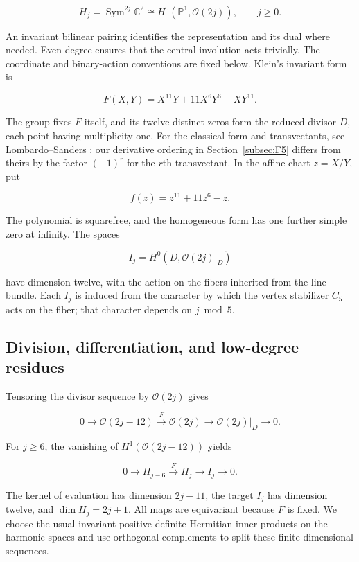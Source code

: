 \documentclass[11pt,a4paper]{article}
\begin{document}
\[
H_j=\operatorname{Sym}^{2j}\mathbb C^2
    \cong H^0(\mathbb P^1,\mathcal O(2j)),\qquad j\ge0.
\]

An invariant bilinear pairing identifies the representation and its dual where needed. Even degree ensures that the central involution acts trivially. The coordinate and binary-action conventions are fixed below. Klein's invariant form is

\[
F(X,Y)=X^{11}Y+11X^6Y^6-XY^{11}.
\]

The group fixes \(F\) itself, and its twelve distinct zeros form the reduced divisor \(D\), each point having multiplicity one. For the classical form and transvectants, see Lombardo--Sanders \citep[Sections 3 and 8.1]{LombardoSanders2010}; our derivative ordering in Section~\ref{subsec:F5} differs from theirs by the factor $(-1)^r$ for the $r$th transvectant. In the affine chart \(z=X/Y\), put

\[
f(z)=z^{11}+11z^6-z.
\]

The polynomial is squarefree, and the homogeneous form has one further simple zero at infinity. The spaces

\[
I_j=H^0(D,\mathcal O(2j)|_D)
\]

have dimension twelve, with the action on the fibers inherited from the line bundle. Each \(I_j\) is induced from the character by which the vertex stabilizer \(C_5\) acts on the fiber; that character depends on \(j\bmod5\).

\subsection{Division, differentiation, and low-degree residues}\label{subsec:F2}

Tensoring the divisor sequence by \(\mathcal O(2j)\) gives

\[
0\longrightarrow\mathcal O(2j-12)
\xrightarrow{\ F\ }\mathcal O(2j)
\longrightarrow\mathcal O(2j)|_D\longrightarrow0.
\]

For \(j\ge6\), the vanishing of \(H^1(\mathcal O(2j-12))\) yields

\[
0\longrightarrow H_{j-6}\xrightarrow{F}H_j
\longrightarrow I_j\longrightarrow0.
\]

The kernel of evaluation has dimension \(2j-11\), the target \(I_j\) has dimension twelve, and \(\dim H_j=2j+1\). All maps are equivariant because \(F\) is fixed. We choose the usual invariant positive-definite Hermitian inner products on the harmonic spaces and use orthogonal complements to split these finite-dimensional sequences.
\end{document}
